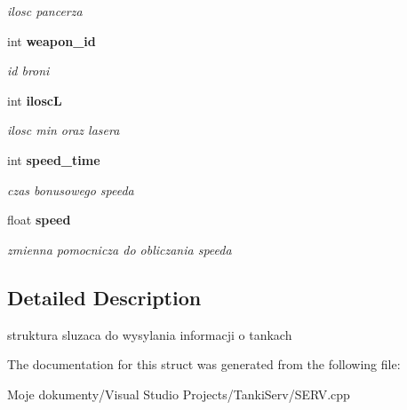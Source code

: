 \begin{CompactItemize}
\begin{CompactList}\small\item\em ilosc pancerza \item\end{CompactList}\item 
int {\bf weapon\_\-id}\label{struct_s_tank_29c8dda8a2cb6600218b17fb7e773b9e}

\begin{CompactList}\small\item\em id broni \item\end{CompactList}\item 
int {\bf iloscL}\label{struct_s_tank_4c05a3f4fed9ed97c4d6383762d978bb}

\begin{CompactList}\small\item\em ilosc min oraz lasera \item\end{CompactList}\item 
int {\bf speed\_\-time}\label{struct_s_tank_ca13b7d007bbc6b519bf0fa89e91ca41}

\begin{CompactList}\small\item\em czas bonusowego speeda \item\end{CompactList}\item 
float {\bf speed}\label{struct_s_tank_85eba6e61a6436db3dad25ba20f37374}

\begin{CompactList}\small\item\em zmienna pomocnicza do obliczania speeda \item\end{CompactList}\end{CompactItemize}


\subsection{Detailed Description}
struktura sluzaca do wysylania informacji o tankach 



The documentation for this struct was generated from the following file:\begin{CompactItemize}
\item 
Moje dokumenty/Visual Studio Projects/TankiServ/SERV.cpp\end{CompactItemize}
